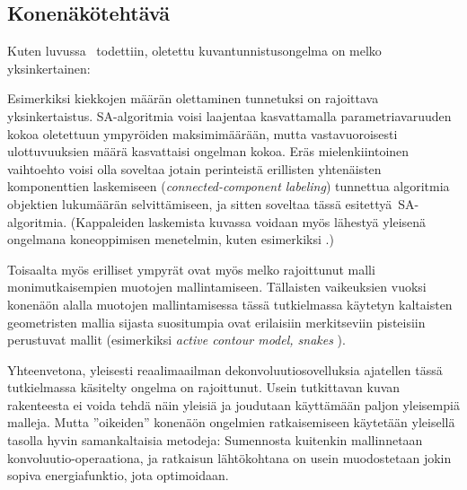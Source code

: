 \subsection{Konenäkötehtävä}
\label{sub:jp_konenako}

Kuten luvussa~ todettiin, oletettu kuvantunnistusongelma on melko yksinkertainen:

Esimerkiksi kiekkojen määrän olettaminen tunnetuksi on rajoittava yksinkertaistus.
SA-algoritmia voisi laajentaa kasvattamalla parametriavaruuden kokoa oletettuun ympyröiden maksimimäärään,
mutta vastavuoroisesti ulottuvuuksien määrä kasvattaisi ongelman kokoa.
Eräs mielenkiintoinen vaihtoehto voisi olla soveltaa jotain perinteistä erillisten yhtenäisten komponenttien laskemiseen (\emph{connected-component labeling}) tunnettua algoritmia \cite{cormenetal09} objektien lukumäärän selvittämiseen,
ja sitten soveltaa tässä esitettyä SA-algoritmia.
(Kappaleiden laskemista kuvassa voidaan myös lähestyä yleisenä ongelmana koneoppimisen menetelmin, kuten esimerkiksi \cite{lempitskyzissermanNIPS10}.)

Toisaalta myös erilliset ympyrät ovat myös melko rajoittunut malli monimutkaisempien muotojen mallintamiseen.
Tällaisten vaikeuksien vuoksi konenäön alalla muotojen mallintamisessa  tässä tutkielmassa käytetyn kaltaisten geometristen mallia sijasta suositumpia ovat erilaisiin merkitseviin pisteisiin perustuvat mallit (esimerkiksi \emph{active contour model, snakes} \cite{prince2012}).

Yhteenvetona, yleisesti reaalimaailman dekonvoluutiosovelluksia ajatellen tässä tutkielmassa käsitelty ongelma on rajoittunut.
Usein tutkittavan kuvan rakenteesta ei voida tehdä näin yleisiä ja joudutaan käyttämään paljon yleisempiä malleja.
Mutta ''oikeiden'' konenäön ongelmien ratkaisemiseen käytetään yleisellä tasolla hyvin samankaltaisia metodeja:
Sumennosta kuitenkin mallinnetaan konvoluutio-operaationa,
ja ratkaisun lähtökohtana on usein muodostetaan jokin sopiva energiafunktio, jota optimoidaan.
